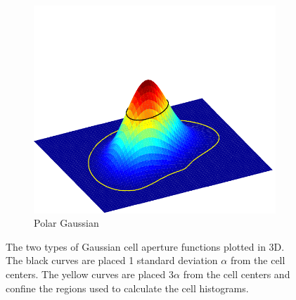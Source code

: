\documentclass[thesis.tex]{subfiles}
\begin{document}
\begin{figure}[p]
\begin{subfigure}[t]{0.40\textwidth}
		\includegraphics[width=\textwidth, clip=true, trim=0 0 0 90]{img/cellWindowPolar.pdf}
		\caption{Polar Gaussian}
		\label{fig:cellWindowPolar}
	\end{subfigure}
	\caption{The two types of Gaussian cell aperture functions plotted in 3D. The black curves are placed 1 standard deviation $\alpha$ from the cell centers. The yellow curves are placed $3 \alpha$ from the cell centers and confine the regions used to calculate the cell histograms.}
	\label{fig:gridWindow}
\end{figure}
%
\end{document}
